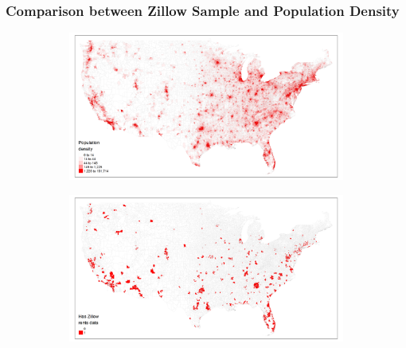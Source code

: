 \documentclass[aspectratio=169, t]{beamer}
\begin{document}
\begin{frame}
	\frametitle{Comparison between Zillow Sample and Population Density}
    \begin{figure}
    	\centering
    	\begin{subfigure}{0.46\textwidth}
    		\includegraphics[scale = 0.34]{maps_US/output/USPS_zipcodes_pop_density.png}
    	\end{subfigure}%
        \begin{subfigure}{0.46\textwidth}
        	\includegraphics[scale = 0.34]{maps_US/output/USPS_zipcodes_zillow_data.png}
        \end{subfigure}
    \end{figure}
\end{frame}

\end{document}
